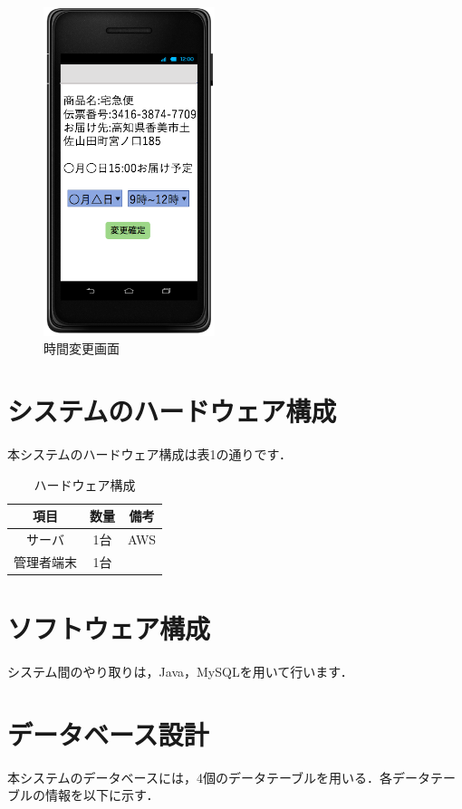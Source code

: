 \documentclass[a4j,titlepage]{jarticle}
\begin{document}
\begin{figure}[H]
 \begin{center}
  \includegraphics[width=50mm]{time_change.png}
	\caption{時間変更画面}
	\label{fig:time_change}
 \end{center}

\end{figure}
\newpage
\section{システムのハードウェア構成}
本システムのハードウェア構成は表1の通りです．
\begin{table}[H]
\begin{center}
 \caption{ハードウェア構成}
  \begin{tabular}{|c|c|c|}\hline
    項目 & 数量 & 備考\\ \hline \hline
    サーバ & 1台 & AWS\\ \hline
    管理者端末 & 1台 & \\ \hline
  \end{tabular}
\end{center}
\end{table}


\section{ソフトウェア構成}
システム間のやり取りは，Java，MySQLを用いて行います．

\section{データベース設計}
本システムのデータベースには，4個のデータテーブルを用いる．各データテーブルの情報を以下に示す．
\end{document}
